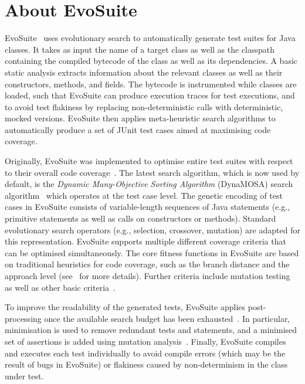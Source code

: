 \documentclass[10pt,conference]{IEEEtran}
\newcommand{\EVOSUITE}{{\sc EvoSuite}\xspace}
\begin{document}
\section{About EvoSuite}


\EVOSUITE~\cite{FrA11c} uses evolutionary search to automatically generate test
suites for Java classes. It takes as input the name of a target class as well
as the classpath containing the compiled bytecode of the class as well as its
dependencies. A basic static analysis extracts information about the relevant
classes as well as their constructors, methods, and fields. The bytecode is
instrumented while classes are loaded, such that \EVOSUITE can produce
execution traces for test executions, and to avoid test flakiness by replacing
non-deterministic calls with deterministic, mocked versions. \EVOSUITE then
applies meta-heuristic search algorithms to automatically produce a set of JUnit
test cases aimed at maximising code coverage. 


Originally, \EVOSUITE was implemented to optimise entire test suites with
respect to their overall code coverage~\cite{GoA_TSE12}. The latest search algorithm, which is now used by default, is the \textit{Dynamic Many-Objective Sorting Algorithm} (DynaMOSA) search algorithm~\cite{dynamosa} which operates at the test case level. 
%
The genetic encoding of test cases in \EVOSUITE consists of variable-length sequences of Java statements (e.g., primitive statements as well as calls on constructors or methods). Standard evolutionary search operators (e.g., selection, crossover, mutation) are adapted for this representation. 
%
\EVOSUITE supports multiple different coverage criteria that can be optimised simultaneously. The core fitness functions in \EVOSUITE are based on traditional heuristics for code coverage, such as the branch distance and the approach level (see~\cite{GoA_TSE12} for more details). Further criteria include mutation testing~\cite{emse14_mutation} as well as other basic
criteria~\cite{rojas2015combining}.


To improve the readability of the generated tests, \EVOSUITE applies post-processing once the available search budget has been exhausted~\cite{FrA11c,FrA13a}. In particular, minimisation is used to remove redundant tests and statements, and a minimised set of assertions is added using mutation analysis~\cite{10.1109/TSE.2011.93}. Finally, \EVOSUITE compiles and executes each test individually to avoid compile errors (which may be the result of bugs in \EVOSUITE) or flakiness caused by non-determinism in the class under test.
\end{document}
